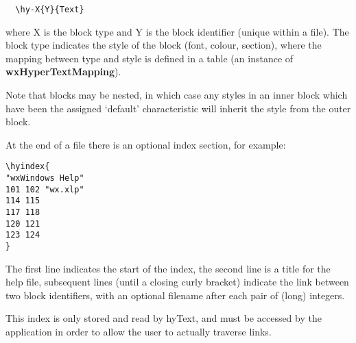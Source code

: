 \begin{verbatim}
  \hy-X{Y}{Text}
\end{verbatim}

where X is the block type and Y is the block identifier (unique within
a file).  The block type indicates the style of the block (font,
colour, section), where the mapping between type and style is defined
in a table (an instance of {\bf wxHyperTextMapping}).

Note that blocks may be nested, in which case any styles in an inner
block which have been the assigned `default' characteristic will
inherit the style from the outer block.

At the end of a file there is an optional index section, for example:

\begin{verbatim}
\hyindex{
"wxWindows Help"
101 102 "wx.xlp"
114 115
117 118
120 121
123 124
}
\end{verbatim}

The first line indicates the start of the index, the second line is
a title for the help file, subsequent lines (until a closing curly bracket)
indicate the link between two block identifiers, with an optional filename
after each pair of (long) integers.

This index is only stored and read by hyText, and must be accessed by
the application in order to allow the user to actually traverse links.


%

